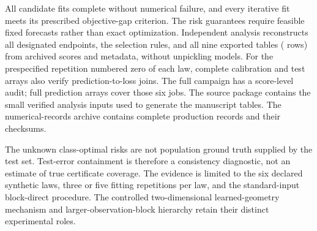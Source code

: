 All candidate fits complete without numerical failure, and every iterative
fit meets its prescribed objective-gap criterion. The risk guarantees require
feasible fixed forecasts rather than exact optimization. Independent analysis
reconstructs all \DimTotalTails{} designated endpoints, the selection rules,
and all nine exported tables (\DimAuditTableRows{} rows) from archived
scores and metadata, without unpickling models. For the prespecified
repetition numbered zero of each law, complete calibration and test arrays
also verify \DimAuditPredictionJoins{} prediction-to-loss joins. The full
campaign has a score-level audit; full prediction arrays cover those six jobs.
The source package contains the small verified analysis inputs used to
generate the manuscript tables. The numerical-records archive contains
complete production records and their checksums.

The unknown class-optimal risks are not population ground truth supplied by
the test set. Test-error containment is therefore a consistency diagnostic,
not an estimate of true certificate coverage. The evidence is limited to the
six declared synthetic laws, three or five fitting repetitions per law, and
the standard-input block-direct procedure. The controlled two-dimensional
learned-geometry mechanism and larger-observation-block hierarchy retain
their distinct experimental roles.
